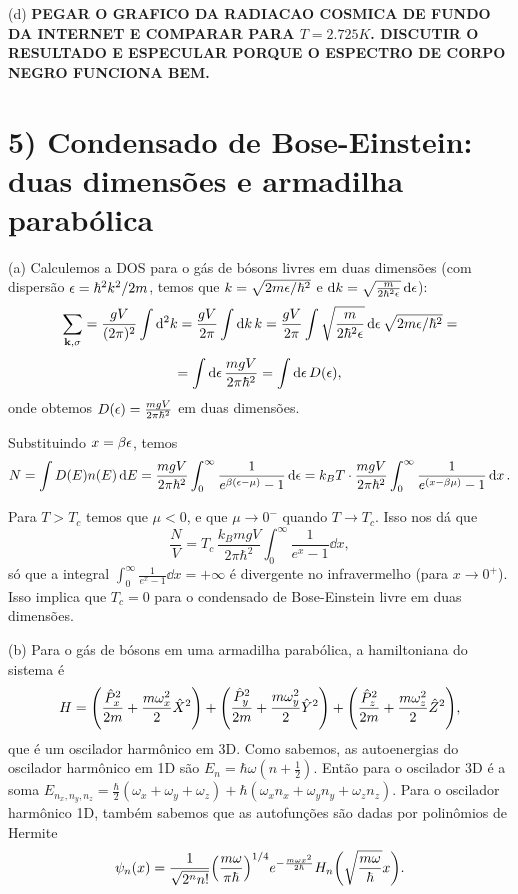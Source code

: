 \documentclass[a4paper,10pt]{article}
\begin{document}
\n\n

(d) \textbf{PEGAR O GRAFICO DA RADIACAO COSMICA DE FUNDO DA INTERNET E COMPARAR PARA $T = 2.725 \unit{K}$. DISCUTIR O RESULTADO E ESPECULAR PORQUE O ESPECTRO DE CORPO NEGRO FUNCIONA BEM.}


\pagebreak

\section*{5) Condensado de Bose-Einstein: duas dimensões e armadilha parabólica}

(a) Calculemos a DOS para o gás de bósons livres em duas dimensões (com dispersão $\epsilon = \hbar^2 k^2 / 2m$, temos que
$k = \sqrt{2m\epsilon/\hbar^2}$ e $\dd{k} = \sqrt{\frac{m}{2\hbar^2\epsilon}} \dd{\epsilon}$):
$$
\sum_{\vb{k}, \sigma} = \frac{g V}{(2\pi)^2} \int \dd[2] k = \frac{gV}{2\pi} \int \dd{k} k =
\frac{gV}{2\pi} \int \sqrt{\frac{m}{2\hbar^2\epsilon}} \dd{\epsilon} \sqrt{2m\epsilon/\hbar^2} =
$$
$$
= \int \dd{\epsilon} \frac{mgV}{2\pi \hbar^2} = \int \dd{\epsilon} D(\epsilon),
$$
onde obtemos $D(\epsilon) = \frac{mgV}{2\pi \hbar^2}$ em duas dimensões.

\n

Substituindo $x = \beta \epsilon$, temos
$$
N = \int D(E) n(E) \dd{E} = \frac{m g V}{2\pi \hbar^2} \int_0^{\infty} \frac{1}{e^{\beta (\epsilon-\mu)} - 1} \dd{\epsilon} =
k_B T \cdot \frac{m g V}{2\pi \hbar^2} \int_0^{\infty} \frac{1}{e^{(x - \beta\mu)} - 1} \dd{x}.
$$

\n

Para $T > T_c$ temos que $\mu < 0$, e que $\mu \to 0^-$ quando $T \to T_c$. Isso nos dá que
$$
\frac{N}{V} = T_c \, \frac{k_B m g V}{2\pi \hbar^2} \int_0^{\infty} \frac{1}{e^{x} - 1} \dd{x},
$$
só que a integral $\int_0^{\infty} \frac{1}{e^{x} - 1} \dd{x} = +\infty$ é divergente no infravermelho (para $x \to 0^+$). Isso implica que $\boxed{T_c = 0}$ para o condensado de Bose-Einstein livre em duas dimensões.

\n

(b) Para o gás de bósons em uma armadilha parabólica, a hamiltoniana do sistema é
$$
H = \qty(\frac{\hat{P}_x^2}{2m} + \frac{m \omega_x^2}{2} \hat{X}^2) +
\qty(\frac{\hat{P}_y^2}{2m} + \frac{m \omega_y^2}{2} \hat{Y}^2) +
\qty(\frac{\hat{P}_z^2}{2m} + \frac{m \omega_z^2}{2} \hat{Z}^2),
$$
que é um oscilador harmônico em 3D. Como sabemos, as autoenergias do oscilador harmônico em 1D são $E_n = \hbar\omega(n+\frac{1}{2})$. Então para o oscilador 3D é a soma $E_{n_x, n_y, n_z} = \frac{\hbar}{2} (\omega_x + \omega_y + \omega_z) + \hbar(\omega_x n_x + \omega_y n_y + \omega_z n_z)$. Para o oscilador harmônico 1D, também sabemos que as autofunções são dadas por polinômios de Hermite
$$
\psi_n(x) = \frac{1}{\sqrt{2^n n!}} \qty(\frac{m\omega}{\pi\hbar})^{1/4} e^{-\frac{m\omega x^2}{2\hbar}}
H_n\qty(\sqrt{\frac{m\omega}{\hbar}} x).
$$
\end{document}
